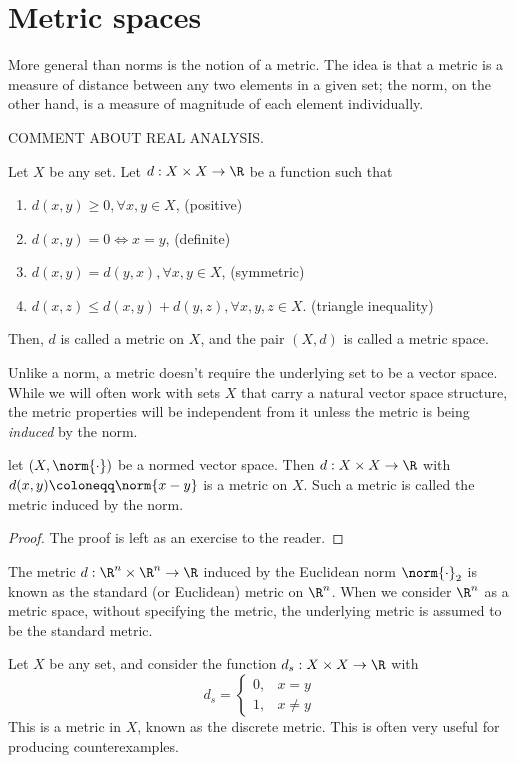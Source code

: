 \documentclass[draft]{penrose}
\begin{document}
\section{Metric spaces}
More general than norms is the notion of a metric. The idea is that a metric is a measure of distance between any two elements in a given set; the norm, on the other hand, is a measure of magnitude of each element individually.

COMMENT ABOUT REAL ANALYSIS.

\begin{ndfn}
  Let $X$ be any set. Let $d : X \times X \to \R$ be a function such that
  \begin{enumerate}
  \item $d(x,y) \geq 0, \forall x,y \in X$, \hfill (positive)
  \item $d(x,y) = 0 \iff x=y$, \hfill (definite)
  \item $d(x,y) = d(y,x), \forall x,y \in X$, \hfill (symmetric)
  \item $d(x,z) \leq d(x,y) + d(y,z), \forall x,y,z \in X$. \hfill (triangle inequality)
  \end{enumerate}
  Then, $d$ is called a metric on $X$, and the pair $(X,d)$ is called a metric space.
\end{ndfn}

Unlike a norm, a metric doesn't require the underlying set to be a vector space. While we will often work with sets $X$ that carry a natural vector space structure, the metric properties will be independent from it unless the metric is being \emph{induced} by the norm.

\begin{nprop}
  let $(X, \norm{\cdot})$ be a normed vector space. Then $d : X \times X \to \R$ with $d(x,y) \coloneqq \norm{x-y}$ is a metric on $X$. Such a metric is called the metric induced by the norm.
\end{nprop}
\begin{proof}
  The proof is left as an exercise to the reader.
\end{proof}

The metric $d:\R^n \times \R^n \to \R$ induced by the Euclidean norm $\norm{\cdot}_2$ is known as the standard (or Euclidean) metric on $\R^n$. When we consider $\R^n$ as a metric space, without specifying the metric, the underlying metric is assumed to be the standard metric.

\begin{negg}
  Let $X$ be any set, and consider the function $d_s:X \times X \to \R$ with
  \begin{equation*}
  d_s = \begin{cases}
  0, & x=y\\
  1, & x \neq y
  \end{cases}
  \end{equation*}
  This is a metric in $X$, known as the discrete metric. This is often very useful for producing counterexamples.
\end{negg}
\end{document}
